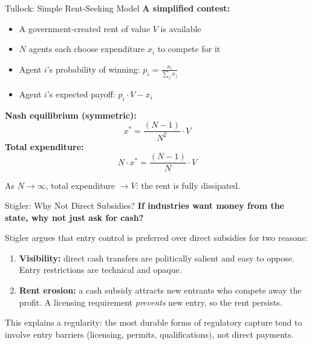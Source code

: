 \documentclass[10pt]{beamer}
\begin{document}
\begin{frame}{Tullock: Simple Rent-Seeking Model}
\textbf{A simplified contest:}

\vspace{0.1cm}
\begin{itemize}
\item A government-created rent of value $V$ is available
\item $N$ agents each choose expenditure $x_i$ to compete for it
\item Agent $i$'s probability of winning: $p_i = \frac{x_i}{\sum_j x_j}$
\item Agent $i$'s expected payoff: $p_i \cdot V - x_i$
\end{itemize}

\vspace{0.1cm}
\textbf{Nash equilibrium (symmetric):}
\[
x^* = \frac{(N-1)}{N^2} \cdot V
\]
\textbf{Total expenditure:}
\[
N \cdot x^* = \frac{(N-1)}{N} \cdot V
\]

\vspace{0.1cm}
\alert{As $N \to \infty$, total expenditure $\to V$:} the rent is fully dissipated.
\end{frame}


\begin{frame}{Stigler: Why Not Direct Subsidies?}
\textbf{If industries want money from the state, why not just ask for cash?}

\vspace{0.1cm}
Stigler argues that \alert{entry control is preferred} over direct subsidies for two reasons:

\vspace{0.1cm}
\begin{enumerate}
\item \textbf{Visibility:} direct cash transfers are politically salient and easy to oppose.
Entry restrictions are technical and opaque.

\vspace{0.1cm}
\item \textbf{Rent erosion:} a cash subsidy attracts new entrants who compete away the profit.
A licensing requirement \emph{prevents} new entry, so the rent persists.
\end{enumerate}

\vspace{0.1cm}
\alert{This explains a regularity:} the most durable forms of regulatory capture tend to involve entry barriers (licensing, permits, qualifications), not direct payments.
\end{frame}
\end{document}

